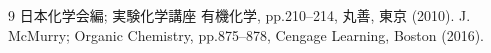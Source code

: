 \begin{thebibliography}{9}
 日本化学会編; 実験化学講座 有機化学, pp.210--214, 丸善, 東京 (2010).
 J. McMurry; Organic Chemistry, pp.875--878, Cengage Learning, Boston (2016).
\end{thebibliography}